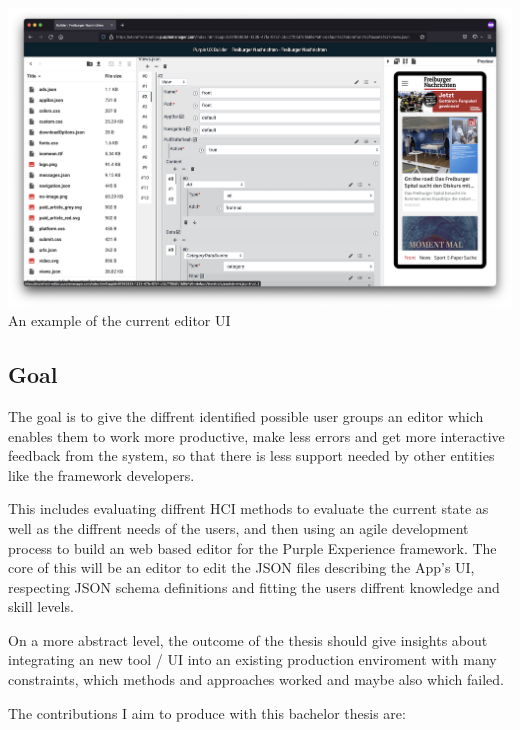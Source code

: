 \includegraphics[width=\textwidth]{pics/current_editor.png}
An example of the current editor UI

\subsection{Goal}
\label{subsec:goal}
The goal is to give the diffrent identified possible user groups an editor
which enables them to work more productive, make less errors and get more interactive feedback from the system,
so that there is less support needed by other entities like the framework developers.


This includes evaluating diffrent HCI methods to evaluate the current state as well as the diffrent needs of the users,
and then using an agile development process to build an web based editor for the Purple Experience framework.
The core of this will be an editor to edit the JSON files describing the App's UI, respecting JSON schema definitions
and fitting the users diffrent knowledge and skill levels.

On a more abstract level, the outcome of the thesis should give insights about integrating an new tool / UI into an existing
production enviroment with many constraints, which methods and approaches worked and maybe also which failed.

The contributions I aim to produce with this bachelor thesis are:

